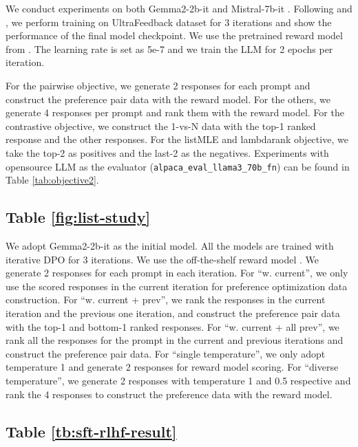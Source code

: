 We conduct experiments on both Gemma2-2b-it \citep{team2024gemma} and Mistral-7b-it \citep{jiang2023mistral}.
Following \citet{Tunstall_The_Alignment_Handbook} and \citet{dong2024rlhf}, we perform training on UltraFeedback dataset for 3 iterations and show the performance of the final model checkpoint.
We use the pretrained reward model from \citet{dong2024rlhf}.
The learning rate is set as 5e-7 and we train the LLM for 2 epochs per iteration.

For the pairwise objective, we generate 2 responses for each prompt and construct the preference pair data with the reward model.
For the others, we generate 4 responses per prompt and rank them with the reward model.
For the contrastive objective, we construct the 1-vs-N data with the top-1 ranked response and the other responses.
For the listMLE and lambdarank objective, we take the top-2 as positives and the last-2 as the negatives.
Experiments with opensource LLM as the evaluator (\texttt{alpaca\_eval\_llama3\_70b\_fn}) can be found in Table \ref{tab:objective2}.



\subsection{Table \ref{fig:list-study}}\label{apx:sec-list-setting}

We adopt Gemma2-2b-it as the initial model. All the models are trained with iterative DPO for 3 iterations. We use the off-the-shelf reward model \citep{dong2024rlhf}.
We generate 2 responses for each prompt in each iteration.
For ``w. current'', we only use the scored responses in the current iteration for preference optimization data construction.
For ``w. current + prev'', we rank the responses in the current iteration and the previous one iteration, and construct the preference pair data with the top-1 and bottom-1 ranked responses.
For ``w. current + all prev'', we rank all the responses for the prompt in the current and previous iterations and construct the preference pair data.
For ``single temperature'', we only adopt temperature 1 and generate 2 responses for reward model scoring.
For ``diverse temperature'', we generate 2 responses with temperature 1 and 0.5 respective and rank the 4 responses to construct the preference data with the reward model.

\subsection{Table \ref{tb:sft-rlhf-result}}\label{apx:sec:sft-rlhf}

